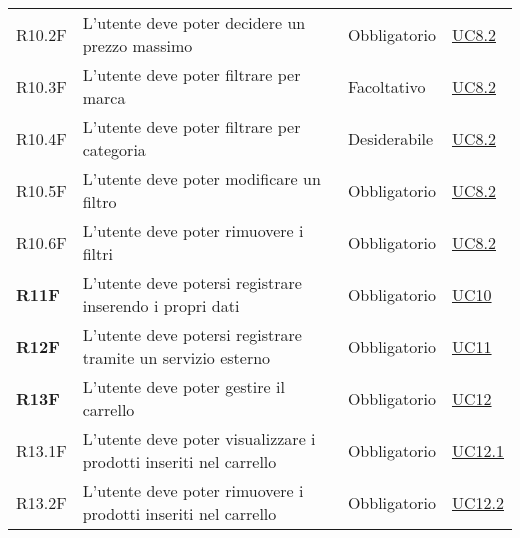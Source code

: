 \begin{center}
\begin{longtable}[!h]{p{50px} p{245px} p{75px} p{50px}}
        R10.2F                                & L'utente deve poter decidere un prezzo massimo                                                             & Obbligatorio             & \hyperref[sec:UC8.2]{UC8.2}                  \\
        R10.3F                                & L'utente deve poter filtrare per marca                                                                     & Facoltativo                & \hyperref[sec:UC8.2]{UC8.2}                  \\
        R10.4F                                & L'utente deve poter filtrare per categoria                                                                 & Desiderabile             & \hyperref[sec:UC8.2]{UC8.2}                  \\
        R10.5F                                & L'utente deve poter modificare un filtro                                                                   & Obbligatorio             & \hyperref[sec:UC8.2]{UC8.2}                  \\
        R10.6F                                & L'utente deve poter rimuovere i filtri                                                                     & Obbligatorio             & \hyperref[sec:UC8.2]{UC8.2}                  \\
        \textbf{R11F}                         & L'utente deve potersi registrare inserendo i propri dati                                                   & Obbligatorio             & \hyperref[sec:UC10]{UC10}                    \\
        \textbf{R12F}                         & L'utente deve potersi registrare tramite un servizio esterno                                               & Obbligatorio             & \hyperref[sec:UC11]{UC11}                    \\
        \textbf{R13F}                         & L'utente deve poter gestire il carrello                                                                    & Obbligatorio             & \hyperref[sec:UC12]{UC12}                    \\
        R13.1F                                & L'utente deve poter visualizzare i prodotti inseriti nel carrello                                          & Obbligatorio             & \hyperref[sec:UC12.1]{UC12.1}                \\
        R13.2F                                & L'utente deve poter rimuovere i prodotti inseriti nel carrello                                             & Obbligatorio             & \hyperref[sec:UC12.2]{UC12.2}                \\

\end{longtable}
\end{center}
